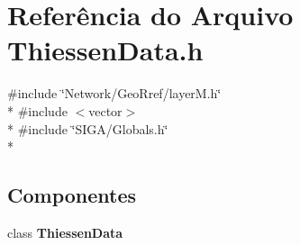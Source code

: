 \section{Referência do Arquivo Thiessen\+Data.\+h}
\label{_thiessen_data_8h}
{\ttfamily \#include \char`\"{}Network/\+Geo\+Rref/layer\+M.\+h\char`\"{}}\\*
{\ttfamily \#include $<$vector$>$}\\*
{\ttfamily \#include \char`\"{}S\+I\+G\+A/\+Globals.\+h\char`\"{}}\\*
\subsection*{Componentes}
\begin{DoxyCompactItemize}
\item 
class {\bf Thiessen\+Data}
\end{DoxyCompactItemize}
